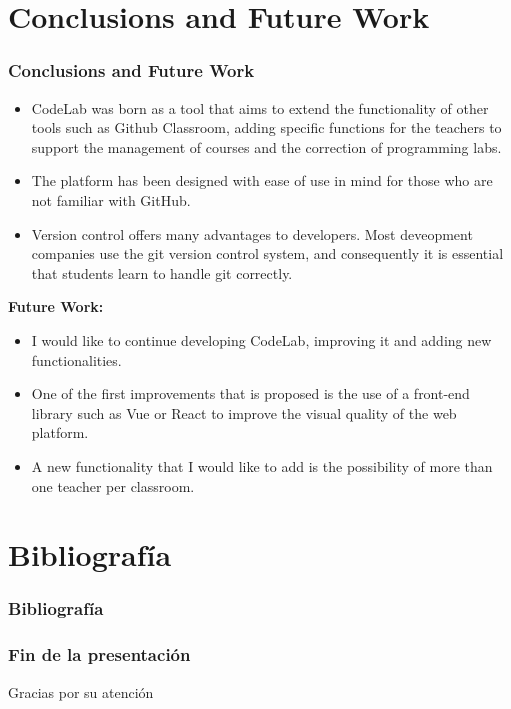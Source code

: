 \documentclass{beamer}
\begin{document}
\section{Conclusions and Future Work}
\begin{frame}[allowframebreaks]
  \frametitle{Conclusions and Future Work}

  \begin{itemize}
    \item CodeLab was born as a tool that aims to extend the functionality of other tools such as Github 
          Classroom, adding specific functions for the teachers to support the management of courses and 
          the correction of programming labs.
    \item The platform has been designed with ease of use in mind for those who are not familiar with GitHub.
    \item Version control offers many advantages to developers. Most deveopment companies use the git 
          version control system, and consequently it is essential that students learn to handle git correctly.
  \end{itemize}
  \framebreak
  
  {\bf Future Work:}
  \begin{itemize}
    \item I would like to continue developing CodeLab, improving it and adding new functionalities. 
    \item One of the first improvements that is proposed is the use of a front-end library such as Vue 
          or React to improve the visual quality of the web platform.
    \item A new functionality that I would like to add is the possibility of more than one teacher per classroom.
  \end{itemize}
\end{frame}


\section{Bibliografía}
\begin{frame}[allowframebreaks]
  \frametitle{Bibliografía}
  
  
  \nocite{*}
\end{frame}

\begin{frame}
  \frametitle{Fin de la presentación}
  \begin{center}
    \Huge{Gracias por su atención}
  \end{center}
\end{frame}
\end{document}
